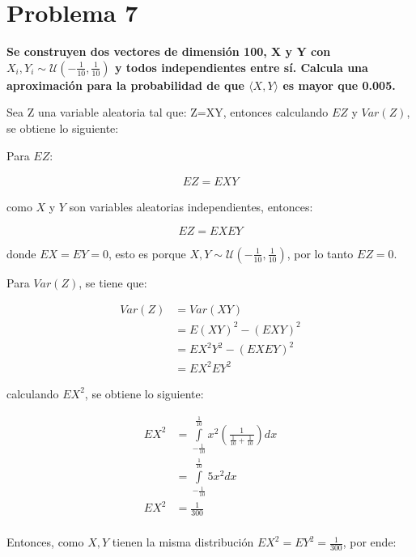 \section*{Problema 7}

\textbf{
    Se construyen dos vectores de dimensión 100, X y Y con $X_i,Y_i \sim \mathcal{U}\left(-\frac{1}{10},\frac{1}{10}\right )$ y todos independientes entre sí. Calcula una aproximación para la probabilidad de que $\langle X,Y \rangle$ es mayor que 0.005.
}

Sea Z una variable aleatoria tal que: Z=XY, entonces calculando $EZ$ y $Var(Z)$, se obtiene lo siguiente:

Para $EZ$:

\begin{align*}
    EZ = EXY
\end{align*}

como $X$ y $Y$ son variables aleatorias independientes, entonces:

\begin{equation*}
    EZ = EX EY
\end{equation*}

donde  $EX=EY=0$, esto es porque $X,Y\sim \mathcal{U}\left(-\frac{1}{10},\frac{1}{10}\right )$, por lo tanto $EZ = 0$.

Para $Var(Z)$, se tiene que:

\begin{align*}
    Var(Z) & = Var(XY)            \\
           & = E(XY)^2 -(EXY)^2   \\
           & = EX^2Y^2 - (EXEY)^2 \\
           & = EX^2 EY^2
\end{align*}

calculando $EX^2$, se obtiene lo siguiente:

\begin{align*}
    EX^2 & = \int\limits_{-\frac{1}{10}}^{\frac{1}{10}} x^2 \left(\frac{1}{\frac{1}{10}+\frac{1}{10}} \right )dx \\
         & = \int\limits_{-\frac{1}{10}}^{\frac{1}{10}} 5x^2 dx                                                  \\
    EX^2 & = \frac{1}{300}                                                                                       \\
\end{align*}

Entonces, como $X,Y$ tienen la misma distribución $EX^2=EY^2=\frac{1}{300}$, por ende:

